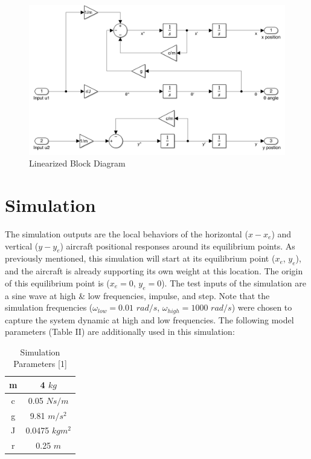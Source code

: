 \documentclass[conference]{IEEEtran}
\begin{document}
\begin{figure}[htbp!]
\centerline{\includegraphics[scale=0.3]{LinearBlock.png}}
\caption{Linearized Block Diagram}
\label{figure}
\end{figure}

\section{Simulation}
The simulation outputs are the local behaviors of the horizontal ($x - x_e$) and vertical ($y - y_e$) aircraft positional responses around its equilibrium points. As previously mentioned, this simulation will start at its equilibrium point ($x_e$, $y_e$), and the aircraft is already supporting its own weight at this location. The origin of this equilibrium point is ($x_e = 0$, $y_e = 0$). The test inputs of the simulation are a sine wave at high \& low frequencies, impulse, and step. Note that the simulation frequencies ($\omega_{low} = 0.01$ $rad/s$, $\omega_{high} = 1000$ $rad/s$) were chosen to capture the system dynamic at high and low frequencies. The following model parameters (Table II) are additionally used in this simulation:\\
\begin{table}[h]
\begin{center}
\caption{Simulation Parameters [1]}
\label{thelabel}
\begin{tabular}{ |c|c| } 
\hline
m	& 4	$kg$\\
\hline
c	&0.05 $Ns/m$\\
\hline
g	 &9.81 $m/s^2$\\
\hline
J	&0.0475	$kgm^2$\\
\hline
r&	0.25 $m$\\
\hline
\end{tabular}
\end{center}

\end{table}
\end{document}
